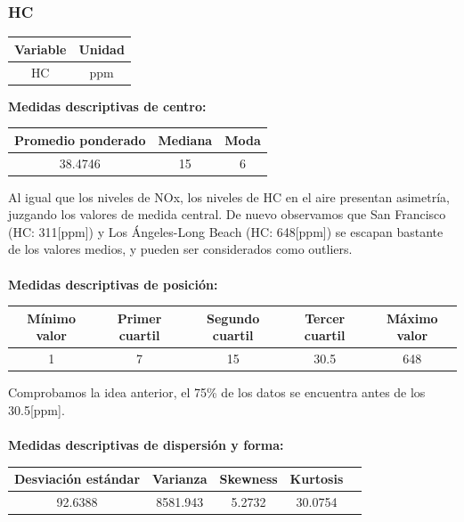\documentclass[11pt]{article}
\begin{document}
\subsubsection{HC}

\begin{center}
\begin{tabular}{|c|c|}
    \hline
    Variable & Unidad  \\ \hline
    HC & ppm \\
    \hline
\end{tabular}
\end{center}

\textbf{Medidas descriptivas de centro:}

\begin{center}
\begin{tabular}{|c|c|c|}
    \hline
    Promedio ponderado & Mediana & Moda \\ \hline
    38.4746 & 15 & 6 \\
    \hline
\end{tabular}
\end{center}

Al igual que los niveles de NOx, los niveles de HC en el aire presentan asimetría, juzgando los valores de medida central. De nuevo observamos que San Francisco (HC: 311[ppm]) y Los Ángeles-Long Beach (HC: 648[ppm]) se escapan bastante de los valores medios, y pueden ser considerados como outliers.
\\
\\
\textbf{Medidas descriptivas de posición:}

\begin{center}
\begin{tabular}{|c|c|c|c|c|}
    \hline
    Mínimo valor & Primer cuartil & Segundo cuartil & Tercer cuartil & Máximo valor\\ \hline
    1 & 7 & 15 & 30.5 & 648\\
    \hline
\end{tabular}
\end{center}

Comprobamos la idea anterior, el 75\% de los datos se encuentra antes de los 30.5[ppm].
\\
\\
\textbf{Medidas descriptivas de dispersión y forma:}

\begin{center}
\begin{tabular}{|c|c|c|c|c|}
    \hline
    Desviación estándar  & Varianza & Skewness & Kurtosis\\ \hline
    92.6388 & 8581.943 & 5.2732 & 30.0754\\
    \hline
\end{tabular}
\end{center}
\end{document}

